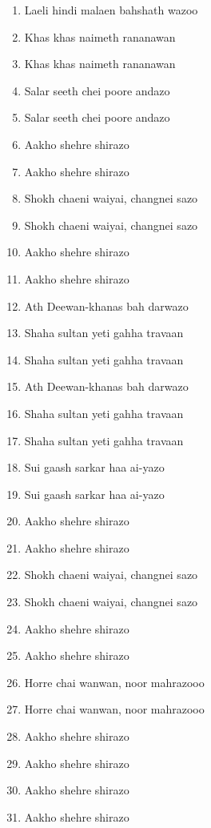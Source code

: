 \documentclass[12pt]{article}
\newcommand{\bigroman}[1]{\fontsize{16pt}{18pt}\selectfont\RaggedRight #1}
\begin{document}
\begin{multicols}{2}
\begin{enumerate}[leftmargin=*, label=\arabic*., font=\fontsize{16pt}{18pt}\selectfont]
  \item \bigroman{Laeli hindi malaen bahshath wazoo}
  \item \bigroman{Khas khas naimeth rananawan}
  \item \bigroman{Khas khas naimeth rananawan}
  \item \bigroman{Salar seeth chei poore andazo}
  \item \bigroman{Salar seeth chei poore andazo}
  \item \bigroman{Aakho shehre shirazo}
  \item \bigroman{Aakho shehre shirazo}
  \item \bigroman{Shokh chaeni waiyai, changnei sazo}
  \item \bigroman{Shokh chaeni waiyai, changnei sazo}
  \item \bigroman{Aakho shehre shirazo}
  \item \bigroman{Aakho shehre shirazo}
  \item \bigroman{Ath Deewan-khanas bah darwazo}
  \item \bigroman{Shaha sultan yeti gahha travaan}
  \item \bigroman{Shaha sultan yeti gahha travaan}
  \item \bigroman{Ath Deewan-khanas bah darwazo}
  \item \bigroman{Shaha sultan yeti gahha travaan}
  \item \bigroman{Shaha sultan yeti gahha travaan}
  \item \bigroman{Sui gaash sarkar haa ai-yazo}
  \item \bigroman{Sui gaash sarkar haa ai-yazo}
  \item \bigroman{Aakho shehre shirazo}
  \item \bigroman{Aakho shehre shirazo}
  \item \bigroman{Shokh chaeni waiyai, changnei sazo}
  \item \bigroman{Shokh chaeni waiyai, changnei sazo}
  \item \bigroman{Aakho shehre shirazo}
  \item \bigroman{Aakho shehre shirazo}
  \item \bigroman{Horre chai wanwan, noor mahrazooo}
  \item \bigroman{Horre chai wanwan, noor mahrazooo}
  \item \bigroman{Aakho shehre shirazo}
  \item \bigroman{Aakho shehre shirazo}
  \item \bigroman{Aakho shehre shirazo}
  \item \bigroman{Aakho shehre shirazo}
\end{enumerate}


\end{multicols}
\end{document}
